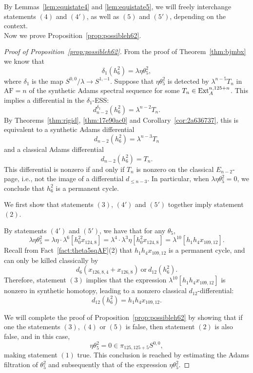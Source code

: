 \documentclass{amsart}
\numberwithin{equation}{section}
\newcommand{\AF}{\mathrm{AF}}
\begin{document}
By Lemmas~\ref{lem:equistate4} and \ref{lem:equistate5}, we will freely interchange statements $(4)$ and $(4')$, as well as $(5)$ and $(5')$, depending on the context.\\

Now we prove Proposition~\ref{prop:possibleh62}.

\begin{proof}[Proof of Proposition~\ref{prop:possibleh62}]
    From the proof of Theorem~\ref{thm:bjmbx} \cite{BurklundXu} we know that
    $$\delta_1(h_6^2) = \lambda \eta \theta_5^2,$$
    where $\delta_1$ is the map $S^{0,0}/\lambda \rightarrow S^{1,-1}$. Suppose that $\eta \theta_5^2$ is detected by $\lambda^{n-5} T_n$ in $\AF = n$ of the synthetic Adams spectral sequence for some $T_n \in \mathrm{Ext}_A^{n, 125+n}$. This implies a differential in the $\delta_1$-ESS:
    $$d_{n-2}^{\delta_1} (h_6^2) = \lambda^{n-2} T_n.$$
    By Theorems~\ref{thm:rigid}, \ref{thm:17e90ac0} and Corollary~\ref{cor:2a636737}, this is equivalent to a 
    synthetic Adams differential
    $$d_{n-2} (h_6^2) = \lambda^{n-3} T_n$$
    and a classical Adams differential
    $$d_{n-2} (h_6^2) = T_n.$$
    This differential is nonzero if and only if $T_n$ is nonzero on the classical $E_{n-2}$-page, i.e., not the image of a differential $d_{\le n-3}$. In particular, when $\lambda \eta \theta_5^2=0$, we conclude that $h_6^2$ is a permanent cycle.

    We first show that statements $(3)$, $(4')$ and $(5')$ together imply statement $(2)$.

    By statements $(4')$ and $(5')$, we have that for any $\theta_5$,
    $$\lambda \eta \theta_5^2 = \lambda \eta \cdot \lambda^6 [h_0^2x_{124,8}] = \lambda^4 \cdot \lambda^3 \eta [h_0^2x_{124,8}] = \lambda^{10} [h_1h_4x_{109,12}].$$
Recall from Fact~\ref{fact:theta5sqAF}(2) that $h_1h_4x_{109,12}$ is a permanent cycle, and can only be killed classically by 
    $$d_6(x_{126,8,4} + x_{126,8}) \ \text{or} \ d_{12}(h_6^2).$$
    Therefore, statement $(3)$ implies that the expression $\lambda^{10} [h_1h_4x_{109,12}]$ is nonzero in synthetic homotopy, leading to a nonzero classical $d_{12}$-differential:
    $$d_{12}(h_6^2) = h_1h_4x_{109,12}.$$
    
We will complete the proof of
    Proposition~\ref{prop:possibleh62} by showing that if one the statements $(3)$, $(4)$ or $(5)$ is false, then statement $(2)$ is also false, and in this case, 
    $$\eta \theta_5^2 = 0 \in \pi_{125,125+5} S^{0,0},$$ 
    making statement $(1)$ true. This conclusion is reached by estimating the Adams filtration of $\theta_5^2$ and subsequently that of the expression $\eta \theta_5^2$. 




\end{proof}
\end{document}
